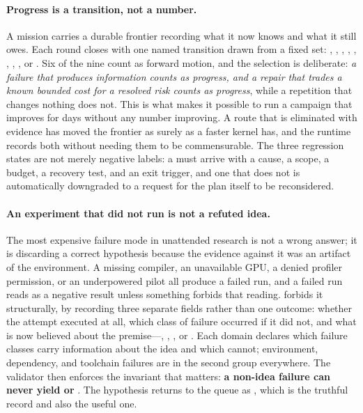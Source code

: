 \paragraph{Progress is a transition, not a number.}
A mission carries a durable frontier recording what it now knows and what it still
owes. Each round closes with one named transition drawn from a fixed set:
, , ,
, , ,
, , or
. Six of the nine count as forward motion, and the
selection is deliberate: \emph{a failure that produces information counts as
progress, and a repair that trades a known bounded cost for a resolved risk counts as
progress}, while a repetition that changes nothing does not. This is what makes it
possible to run a campaign that improves for days without any number improving. A
route that is eliminated with evidence has moved the frontier as surely as a faster
kernel has, and the runtime records both without needing them to be commensurable.
The three regression states are not merely negative labels: a
 must arrive with a cause, a scope, a budget, a recovery
test, and an exit trigger, and one that does not is automatically downgraded to a
request for the plan itself to be reconsidered.

\paragraph{An experiment that did not run is not a refuted idea.}
The most expensive failure mode in unattended research is not a wrong answer; it is
discarding a correct hypothesis because the evidence against it was an artifact of
the environment. A missing compiler, an unavailable GPU, a denied profiler
permission, or an underpowered pilot all produce a failed run, and a failed run reads
as a negative result unless something forbids that reading. \systemname{} forbids it
structurally, by recording three separate fields rather than one outcome: whether the
attempt executed at all, which class of failure occurred if it did not, and what is
now believed about the premise---, ,
, or . Each domain declares which failure classes carry
information about the idea and which cannot; environment, dependency, and toolchain
failures are in the second group everywhere. The validator then enforces the
invariant that matters: \textbf{a non-idea failure can never yield
 or }. The hypothesis returns to the queue as
, which is the truthful record and also the useful one.

